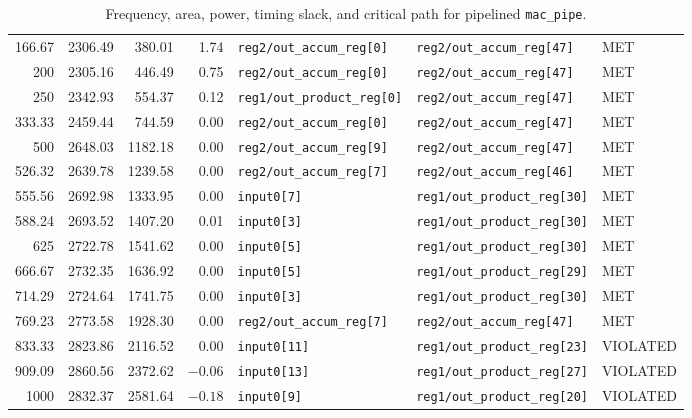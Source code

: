 \documentclass[a4paper,11pt]{article}
\begin{document}
\begin{table}[H]
{\begin{tabular}{rrrrlll}
        166.67  & 2306.49 & 380.01  & 1.74   & \texttt{reg2/out\_accum\_reg[0]}  & \texttt{reg2/out\_accum\_reg[47]} & MET \\
        200     & 2305.16 & 446.49  & 0.75   & \texttt{reg2/out\_accum\_reg[0]}  & \texttt{reg2/out\_accum\_reg[47]} & MET \\
        250     & 2342.93 & 554.37  & 0.12   & \texttt{reg1/out\_product\_reg[0]} & \texttt{reg2/out\_accum\_reg[47]} & MET \\
        333.33  & 2459.44 & 744.59  & 0.00   & \texttt{reg2/out\_accum\_reg[0]}  & \texttt{reg2/out\_accum\_reg[47]} & MET \\
        500     & 2648.03 & 1182.18 & 0.00   & \texttt{reg2/out\_accum\_reg[9]}  & \texttt{reg2/out\_accum\_reg[47]} & MET \\
        526.32  & 2639.78 & 1239.58 & 0.00   & \texttt{reg2/out\_accum\_reg[7]}  & \texttt{reg2/out\_accum\_reg[46]} & MET \\
        555.56  & 2692.98 & 1333.95 & 0.00   & \texttt{input0[7]}  & \texttt{reg1/out\_product\_reg[30]} & MET \\
        588.24  & 2693.52 & 1407.20 & 0.01   & \texttt{input0[3]}  & \texttt{reg1/out\_product\_reg[30]} & MET \\
        625     & 2722.78 & 1541.62 & 0.00   & \texttt{input0[5]}  & \texttt{reg1/out\_product\_reg[30]} & MET \\
        666.67  & 2732.35 & 1636.92 & 0.00   & \texttt{input0[5]}  & \texttt{reg1/out\_product\_reg[29]} & MET \\
        714.29  & 2724.64 & 1741.75 & 0.00   & \texttt{input0[3]}  & \texttt{reg1/out\_product\_reg[30]} & MET \\
        769.23  & 2773.58 & 1928.30 & 0.00   & \texttt{reg2/out\_accum\_reg[7]}  & \texttt{reg2/out\_accum\_reg[47]} & MET \\
        833.33  & 2823.86 & 2116.52 & 0.00   & \texttt{input0[11]} & \texttt{reg1/out\_product\_reg[23]} & VIOLATED\footnotemark \\
        909.09  & 2860.56 & 2372.62 & $-0.06$ & \texttt{input0[13]} & \texttt{reg1/out\_product\_reg[27]} & VIOLATED \\
        1000    & 2832.37 & 2581.64 & $-0.18$ & \texttt{input0[9]}  & \texttt{reg1/out\_product\_reg[20]} & VIOLATED \\
        \bottomrule
    \end{tabular}}
    \caption{Frequency, area, power, timing slack, and critical path for pipelined \texttt{mac\_pipe}.}
    \label{tab:pipe-frequency-area-slack-path} 
\end{table}
\end{document}
